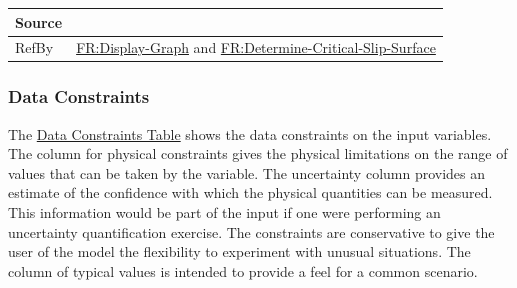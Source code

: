 \documentclass[12pt]{article}
\begin{document}
\begin{minipage}{\textwidth}
\begin{tabular}{>{\raggedright}p{}>{\raggedright\arraybackslash}p{}}
\\ \midrule
Source & \cite{li2010}
         
\\ \midrule
RefBy & \hyperref[displayGraph]{FR:Display-Graph} and \hyperref[determineCritSlip]{FR:Determine-Critical-Slip-Surface}
        
\\ \bottomrule
\end{tabular}
\end{minipage}

\subsubsection{Data Constraints}
\label{Sec:DataConstraints}
The \hyperref[Table:InDataConstraints]{Data Constraints Table} shows the data constraints on the input variables. The column for physical constraints gives the physical limitations on the range of values that can be taken by the variable. The uncertainty column provides an estimate of the confidence with which the physical quantities can be measured. This information would be part of the input if one were performing an uncertainty quantification exercise. The constraints are conservative to give the user of the model the flexibility to experiment with unusual situations. The column of typical values is intended to provide a feel for a common scenario.
\end{document}
